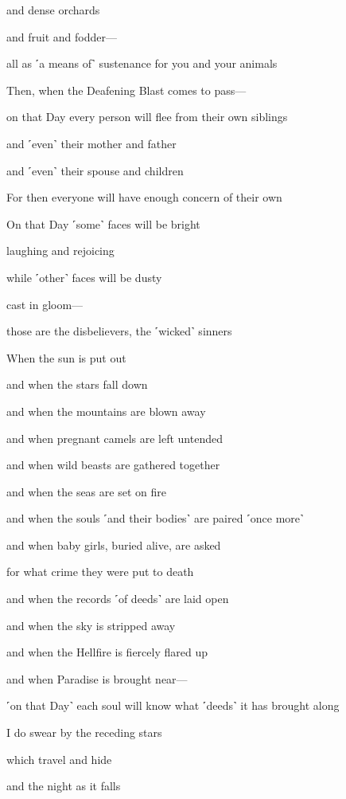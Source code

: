 and dense orchards

and fruit and fodder—

all as ˹a means of˺ sustenance for you and your animals

Then, when the Deafening Blast comes to pass—

on that Day every person will flee from their own siblings

and ˹even˺ their mother and father

and ˹even˺ their spouse and children

For then everyone will have enough concern of their own

On that Day ˹some˺ faces will be bright

laughing and rejoicing

while ˹other˺ faces will be dusty

cast in gloom—

those are the disbelievers, the ˹wicked˺ sinners

When the sun is put out

and when the stars fall down

and when the mountains are blown away

and when pregnant camels are left untended

and when wild beasts are gathered together

and when the seas are set on fire

and when the souls ˹and their bodies˺ are paired ˹once more˺

and when baby girls, buried alive, are asked

for what crime they were put to death

and when the records ˹of deeds˺ are laid open

and when the sky is stripped away

and when the Hellfire is fiercely flared up

and when Paradise is brought near—

˹on that Day˺ each soul will know what ˹deeds˺ it has brought along

I do swear by the receding stars

which travel and hide

and the night as it falls

